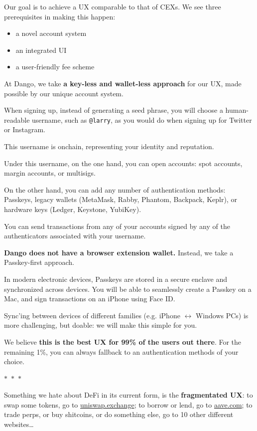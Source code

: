 \documentclass{article}
\newcommand{\separator}{%
  \begin{center}
    $\ast$~$\ast$~$\ast$
  \end{center}
}
\newcommand{\image}[2]{%
  \begin{center}
    \makebox[\textwidth]{ \texttt{[image: \#1]}}%
  \end{center}
  \begin{center}
    \captionsetup{type=figure}
    \captionof{figure}{#2}
  \end{center}
}
\begin{document}
Our goal is to achieve a UX comparable to that of CEXs. We see three prerequisites in making this happen:

\begin{itemize}
  \item a novel account system
  \item an integrated UI
  \item a user-friendly fee scheme
\end{itemize}

At Dango, we take \textbf{a key-less and wallet-less approach} for our UX, made possible by our unique account system.

When signing up, instead of generating a seed phrase, you will choose a human-readable username, such as \texttt{@larry}, as you would do when signing up for Twitter or Instagram.

This username is onchain, representing your identity and reputation.

Under this username, on the one hand, you can open accounts: spot accounts, margin accounts, or multisigs.

\image{images/4-account-system.jpeg}{Account system}

On the other hand, you can add any number of authentication methods: Passkeys, legacy wallets (MetaMask, Rabby, Phantom, Backpack, Keplr), or hardware keys (Ledger, Keystone, YubiKey).

You can send transactions from any of your accounts signed by any of the authenticators associated with your username.

\textbf{Dango does not have a browser extension wallet.} Instead, we take a Passkey-first approach.

In modern electronic devices, Passkeys are stored in a secure enclave and synchronized across devices. You will be able to seamlessly create a Passkey on a Mac, and sign transactions on an iPhone using Face ID.

Sync'ing between devices of different families (e.g. iPhone $\leftrightarrow$ Windows PCs) is more challenging, but doable: we will make this simple for you.

We believe \textbf{this is the best UX for 99\% of the users out there}. For the remaining 1\%, you can always fallback to an authentication methods of your choice.

\separator

Something we hate about DeFi in its current form, is the \textbf{fragmentated UX}: to swap some tokens, go to \url{uniswap.exchange}; to borrow or lend, go to \url{aave.com}; to trade perps, or buy shitcoins, or do something else, go to 10 other different websites…
\end{document}
